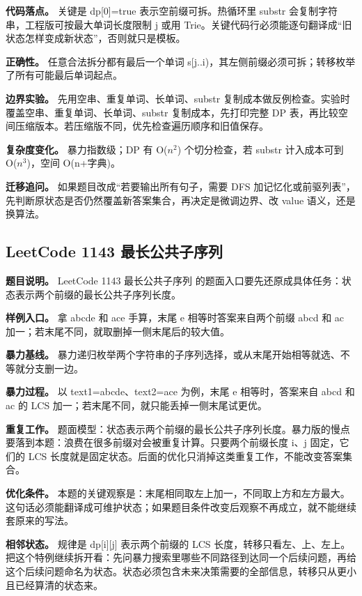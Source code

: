 \textbf{代码落点。} 关键是 dp[0]=true 表示空前缀可拆。热循环里 substr 会复制字符串，工程版可按最大单词长度限制 j 或用 Trie。关键代码行必须能逐句翻译成“旧状态怎样变成新状态”，否则就只是模板。

\textbf{正确性。} 任意合法拆分都有最后一个单词 s[j..i)，其左侧前缀必须可拆；转移枚举了所有可能最后单词起点。

\textbf{边界实验。} 先用空串、重复单词、长单词、substr 复制成本做反例检查。实验时覆盖空串、重复单词、长单词、substr 复制成本，先打印完整 DP 表，再比较空间压缩版本。若压缩版不同，优先检查遍历顺序和旧值保存。

\textbf{复杂度变化。} 暴力指数级；DP 有 O(\ensuremath{n^{2}}) 个切分检查，若 substr 计入成本可到 O(\ensuremath{n^{3}})，空间 O(n+字典)。

\textbf{迁移追问。} 如果题目改成“若要输出所有句子，需要 DFS 加记忆化或前驱列表”，先判断原状态是否仍然覆盖新答案集合，再决定是微调边界、改 value 语义，还是换算法。

\subsection{LeetCode 1143 最长公共子序列}

\textbf{题目说明。} LeetCode 1143 最长公共子序列 的题面入口要先还原成具体任务：状态表示两个前缀的最长公共子序列长度。

\textbf{样例入口。} 拿 abcde 和 ace 手算，末尾 e 相等时答案来自两个前缀 abcd 和 ac 加一；若末尾不同，就取删掉一侧末尾后的较大值。

\textbf{暴力基线。} 暴力递归枚举两个字符串的子序列选择，或从末尾开始相等就选、不等就分支删一边。

\textbf{暴力过程。} 以 text1=abcde、text2=ace 为例，末尾 e 相等时，答案来自 abcd 和 ac 的 LCS 加一；若末尾不同，就只能丢掉一侧末尾试更优。

\textbf{重复工作。} 题面模型：状态表示两个前缀的最长公共子序列长度。暴力版的慢点要落到本题：浪费在很多前缀对会被重复计算。只要两个前缀长度 i、j 固定，它们的 LCS 长度就是固定状态。后面的优化只消掉这类重复工作，不能改变答案集合。

\textbf{优化条件。} 本题的关键观察是：末尾相同取左上加一，不同取上方和左方最大。这句话必须能翻译成可维护状态；如果题目条件改变后观察不再成立，就不能继续套原来的写法。

\textbf{相邻状态。} 规律是 dp[i][j] 表示两个前缀的 LCS 长度，转移只看左、上、左上。把这个特例继续拆开看：先问暴力搜索里哪些不同路径到达同一个后续问题，再给这个后续问题命名为状态。状态必须包含未来决策需要的全部信息，转移只从更小且已经算清的状态来。

